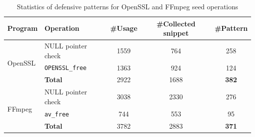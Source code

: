 \begin{table}[t]
\centering
\footnotesize
\caption{Statistics of defensive patterns for OpenSSL and FFmpeg seed operations}
\vspace{-6px}
\renewcommand{\arraystretch}{1.08}
\label{tab:openssl_ffmpeg_defensive_op_stats}
\begin{tabular}{llccc}
\toprule
\textbf{Program} & \textbf{Operation} & \textbf{\#Usage} & \textbf{\#Collected snippet} & \textbf{\#Pattern} \\
\midrule
\multirow{3}{*}{OpenSSL}
& NULL pointer check        & \num{1559} & \num{764}  & \num{258} \\
& \texttt{OPENSSL\_free}    & \num{1363} & \num{924}  & \num{124} \\
& \textbf{Total}            & \num{2922} & \num{1688} & \textbf{\num{382}} \\
\midrule
\multirow{3}{*}{FFmpeg}
& NULL pointer check        & \num{3038} & \num{2330} & \num{276} \\
& \texttt{av\_free}         & \num{744}  & \num{553}  & \num{95} \\
& \textbf{Total}            & \num{3782} & \num{2883} & \textbf{\num{371}} \\
\bottomrule
\end{tabular}
\end{table}
